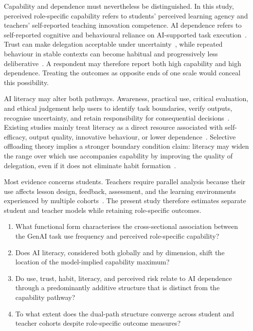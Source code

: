 \documentclass[sustainability,article,accept,moreauthors]{Definitions/mdpi}
\begin{document}
Capability and dependence must nevertheless be distinguished. In this study, perceived role-specific capability refers to students' perceived learning agency and teachers' self-reported teaching innovation competence. AI dependence refers to self-reported cognitive and behavioural reliance on AI-supported task execution~\cite{morales2024,du2026,kalimira2026}. Trust can make delegation acceptable under uncertainty~\cite{lee2004,hoff2015}, while repeated behaviour in stable contexts can become habitual and progressively less deliberative~\cite{limayem2007,woodneal2007}. A respondent may therefore report both high capability and high dependence. Treating the outcomes as opposite ends of one scale would conceal this possibility.

AI literacy may alter both pathways. Awareness, practical use, critical evaluation, and ethical judgement help users to identify task boundaries, verify outputs, recognise uncertainty, and retain responsibility for consequential decisions~\cite{long2020,wang2023}. Existing studies mainly treat literacy as a direct resource associated with self-efficacy, output quality, innovative behaviour, or lower dependence~\cite{becirovic2025,zhang2025,zi2026}. Selective offloading theory implies a stronger boundary condition claim: literacy may widen the range over which use accompanies capability by improving the quality of delegation, even if it does not eliminate habit formation~\cite{tankelevitch2024,bucinca2021}.

Most evidence concerns students. Teachers require parallel analysis because their use affects lesson design, feedback, assessment, and the learning environments experienced by multiple cohorts~\cite{zhaiTeacher2025}. The present study therefore estimates separate student and teacher models while retaining role-specific outcomes.


\begin{enumerate}[label=\textbf{\hl{RQ}%
\arabic*.},leftmargin=3.4em,labelwidth=2.75em,labelsep=.55em]
\item What functional form characterises the cross-sectional association between the GenAI task use frequency and perceived role-specific capability?
\item Does AI literacy, considered both globally and by dimension, shift the location of the model-implied capability maximum?
\item Do use, trust, habit, literacy, and perceived risk relate to AI dependence through a predominantly additive structure that is distinct from the capability pathway?
\item To what extent does the dual-path structure converge across student and teacher cohorts despite role-specific outcome measures?
\end{enumerate}
\end{document}
